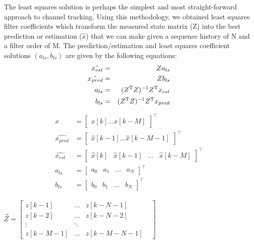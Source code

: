 \documentclass[twocolumn,letterpaper]{IEEEAerospaceCLS}  %
\begin{document}
The least squares solution is perhaps the simplest and most straight-forward approach to channel tracking. Using this methodology, we obtained least squares filter coefficients which transform the measured state matrix (Z) into the best prediction or estimation ($\hat{x}$) that we can make given a sequence history of N and a filter order of M. The prediction/estimation and least squares coefficient solutions $(a_{ls}, b_{ls})$ are given by the following equations:
\begin{eqnarray*}
\hat{x_{est}}&=&Za_{ls} \\ 
\hat{x_{pred}}&=&Zb_{ls} \\ 
a_{ls}&=&(Z^{\rm T}Z)^{-1}Z^{\rm T}x_{est} \\
b_{ls}&=&(Z^{\rm T}Z)^{-1}Z^{\rm T}x_{pred}
\end{eqnarray*}
\begin{align}
\begin{aligned}
x&= \left[ \begin{matrix}  x[k]   \dots    x[k-M] \end{matrix} \right]^\top\\
\hat{x_{pred}} &= \left[ \begin{matrix} \hat{x}[k-1]  \dots \hat{x}[k-M-1]\end{matrix} \right]^\top\\
\hat{x_{est}}&= \left[ \begin{matrix}   \hat{x}[k]  & \hat{x}[k-1]  &  \dots & \hat{x}[k-M] \end{matrix}\right]^\top\\
a_{ls}&=  \left[ \begin{matrix}    a_{0} &  a_{1} &  \dots  & a_{N} \end{matrix} \right]^\top\\
b_{ls}&= \left[ \begin{matrix}   b_{0}   & b_{1}  & \dots &  b_{N}\end{matrix}\right]^\top
\end{aligned}
\end{align}

$\vec{Z} = \begin{bmatrix}
   z[k-1]   & ...       & z[k-N-1]     & \\
   z[k-2]   & ...       & z[k-N-2]     & \\
   \vdots             &  \ddots   &              & \\
   z[k-M-1] & ...       & z[k-M-N-1]  
\end{bmatrix}$
\end{document}
